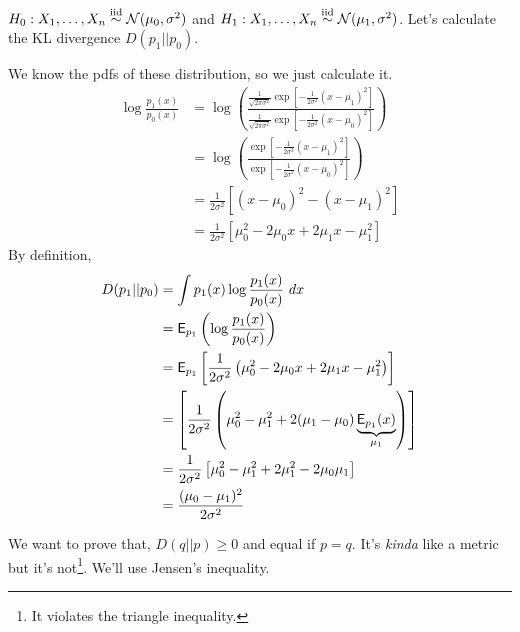 \begin{example}
    $H_0: X_1, \dots, X_n\overset{\mathrm{iid}}{\sim}\mathcal N(\mu_0, \sigma^2)$ and $H_1: X_1, \dots, X_n\overset{\mathrm{iid}}{\sim}\mathcal N(\mu_1, \sigma^2)$. Let's calculate the KL divergence $D(p_1||p_0)$.

    We know the pdfs of these distribution, so we just calculate it.
    \begin{align*}
        \log \frac{p_1(x)}{p_0(x)}
         & = \log\left( \frac{\frac{1}{\sqrt{2\pi\sigma^2}} \exp\left[ -\frac{1}{2\sigma^2}(x - \mu_1)^2 \right]}{\frac{1}{\sqrt{2\pi\sigma^2}} \exp\left[ -\frac{1}{2\sigma^2}(x - \mu_0)^2 \right]} \right) \\
         & = \log\left( \frac{ \exp\left[ -\frac{1}{2\sigma^2}(x - \mu_1)^2 \right]}{\exp\left[ -\frac{1}{2\sigma^2}(x - \mu_0)^2 \right]} \right)                                                            \\
         & = \frac{1}{2\sigma^2}\left[ (x - \mu_0)^2 - (x - \mu_1)^2 \right]                                                                                                                                  \\
         & = \frac{1}{2\sigma^2}\left[ \mu_0^2 - 2\mu_0x + 2\mu_1x -\mu_1^2 \right]
    \end{align*}
    By definition,
    \begin{align*}
        D(p_1||p_0)
         & = \int p_1(x)\log \frac{p_1(x)}{p_0(x)}\ dx                                                                             \\
         & = \E_{p_1}\left( \log \frac{p_1(x)}{p_0(x)} \right)                                                                     \\
         & = \E_{p_1} \left[ \frac{1}{2\sigma^2}\left( \mu_0^2 - 2\mu_0x + 2\mu_1x -\mu_1^2 \right) \right]                        \\
         & = \left[ \frac{1}{2\sigma^2}\left( \mu_0^2 - \mu_1^2 + 2(\mu_1 - \mu_0)\underbrace{\E_{p_1}(x)}_{\mu_1} \right) \right] \\
         & = \frac{1}{2\sigma^2}\left[ \mu_0^2 - \mu_1^2 + 2\mu_1^2 - 2\mu_0\mu_1 \right]                                          \\
         & = \frac{(\mu_0 - \mu_1)^2}{2\sigma^2}
    \end{align*}
\end{example}
We want to prove that, $D(q||p)\geq 0$ and equal if $p = q$. It's \emph{kinda} like a metric but it's not\footnote{It violates the triangle inequality.}. We'll use Jensen's inequality.
